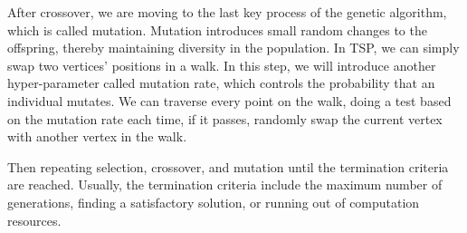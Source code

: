 \documentclass[letterpaper, 12 pt, conference]{ieeeconf}  %
\begin{document}
After crossover, we are moving to the last key process of the genetic algorithm, which is called mutation. Mutation introduces small random changes to the offspring, thereby maintaining diversity in the population. In TSP, we can simply swap two vertices' positions in a walk. In this step, we will introduce another hyper-parameter called mutation rate, which controls the probability that an individual mutates. We can traverse every point on the walk, doing a test based on the mutation rate each time, if it passes, randomly swap the current vertex with another vertex in the walk.

Then repeating selection, crossover, and mutation until the termination criteria are reached. Usually, the termination criteria include the maximum number of generations, finding a satisfactory solution, or running out of computation resources. 
\end{document}
